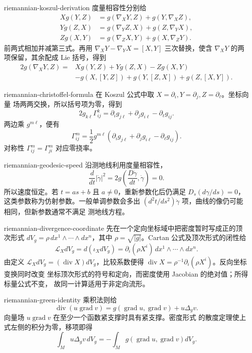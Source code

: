 \begin{solution}{riemannian-koszul-derivation}
度量相容性分别给
\begin{align*}
 Xg(Y,Z)&=g(\nabla_XY,Z)+g(Y,\nabla_XZ),\\
 Yg(Z,X)&=g(\nabla_YZ,X)+g(Z,\nabla_YX),\\
 Zg(X,Y)&=g(\nabla_ZX,Y)+g(X,\nabla_ZY).
\end{align*}
前两式相加并减第三式。再用
$\nabla_XY-\nabla_YX=[X,Y]$ 三次替换，使含
$\nabla_XY$ 的两项保留，其余配成 Lie 括号，得到
\[
\begin{aligned}
 2g(\nabla_XY,Z)={}&Xg(Y,Z)+Yg(Z,X)-Zg(X,Y)\\
 &-g(X,[Y,Z])+g(Y,[Z,X])+g(Z,[X,Y]).
\end{aligned}
\]
\end{solution}

\begin{solution}{riemannian-christoffel-formula}
在 Koszul 公式中取 $X=\partial_i,Y=\partial_j,Z=\partial_\ell$。坐标向量
场两两交换，所以括号项为零，得到
\[
 2g_{k\ell}\Gamma^k_{ij}
 =\partial_i g_{j\ell}+\partial_jg_{i\ell}-\partial_\ell g_{ij}.
\]
两边乘 $g^{m\ell}$，便有
\[
 \Gamma^m_{ij}=\frac12g^{m\ell}
 (\partial_i g_{j\ell}+\partial_jg_{i\ell}-\partial_\ell g_{ij}).
\]
对称性 $\Gamma^m_{ij}=\Gamma^m_{ji}$ 对应零挠率。
\end{solution}

\begin{solution}{riemannian-geodesic-speed}
沿测地线利用度量相容性，
\[
 \frac d{dt}|\dot\gamma|^2
 =2g\!\left(\frac{D\dot\gamma}{dt},\dot\gamma\right)=0.
\]
所以速度恒定。若 $t=as+b$ 且 $a\ne0$，重新参数化后仍满足
$D_s(d\gamma/ds)=0$，这类参数称为仿射参数。一般单调参数会多出
$(d^2t/ds^2)\dot\gamma$ 项，曲线的像仍可能相同，但新参数通常不满足
测地线方程。
\end{solution}

\begin{solution}{riemannian-divergence-coordinate}
先在一个定向坐标域中把密度暂时写成正的顶次形式
$dV_g=\rho\,dx^1\wedge\cdots\wedge dx^n$，其中
$\rho=\sqrt{|g|}$。Cartan 公式及顶次形式的闭性给
\[
 \mathcal L_XdV_g=d(\iota_XdV_g)
 =\partial_i(\rho X^i)\,dx^1\wedge\cdots\wedge dx^n.
\]
由定义 $\mathcal L_XdV_g=(\operatorname{div}X)dV_g$，比较系数便得
$\operatorname{div}X=\rho^{-1}\partial_i(\rho X^i)$。反向坐标变换同时改变
坐标顶次形式的符号和定向，而密度使用 Jacobian 的绝对值；所得标量公式不变，
故同一计算适用于非定向流形。
\end{solution}

\begin{solution}{riemannian-green-identity}
乘积法则给
\[
 \operatorname{div}(u\operatorname{grad}v)
 =g(\operatorname{grad}u,\operatorname{grad}v)+u\Delta_gv.
\]
向量场 $u\operatorname{grad}v$ 在至少一个函数紧支撑时具有紧支撑。密度形式
的散度定理使上式左侧的积分为零，移项即得
\[
 \int_Mu\Delta_gv\,dV_g
 =-\int_Mg(\operatorname{grad}u,\operatorname{grad}v)dV_g.
\]
\end{solution}

